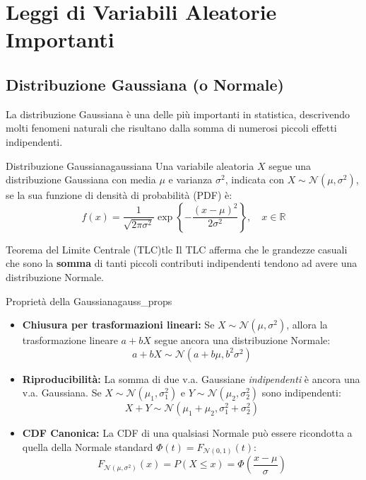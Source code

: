 \section{Leggi di Variabili Aleatorie Importanti}\label{sec:leggi_va}

\subsection{Distribuzione Gaussiana (o Normale)}
La distribuzione Gaussiana è una delle più importanti in statistica, descrivendo molti fenomeni naturali che risultano dalla somma di numerosi piccoli effetti indipendenti.

\begin{definizione}{Distribuzione Gaussiana}{gaussiana}
Una variabile aleatoria \(X\) segue una distribuzione Gaussiana con media \(\mu\) e varianza \(\sigma^2\), indicata con \(X \sim \mathcal{N}(\mu, \sigma^2)\), se la sua funzione di densità di probabilità (PDF) è:
\[
f(x) = \frac{1}{\sqrt{2\pi\sigma^2}} \exp\left\{ -\frac{(x-\mu)^2}{2\sigma^2} \right\}, \quad x \in \mathbb{R}
\]
\end{definizione}

\begin{nota}{Teorema del Limite Centrale (TLC)}{tlc}
Il TLC afferma che le grandezze casuali che sono la \textbf{somma} di tanti piccoli contributi indipendenti tendono ad avere una distribuzione Normale.
\end{nota}

\begin{proposizione}{Proprietà della Gaussiana}{gauss_props}
\begin{itemize}
    \item \textbf{Chiusura per trasformazioni lineari:} Se \(X \sim \mathcal{N}(\mu, \sigma^2)\), allora la trasformazione lineare \(a + bX\) segue ancora una distribuzione Normale:
    \[ a+bX \sim \mathcal{N}(a+b\mu, b^2\sigma^2) \]
    \item \textbf{Riproducibilità:} La somma di due v.a. Gaussiane \emph{indipendenti} è ancora una v.a. Gaussiana. Se \(X \sim \mathcal{N}(\mu_1, \sigma_1^2)\) e \(Y \sim \mathcal{N}(\mu_2, \sigma_2^2)\) sono indipendenti:
    \[ X+Y \sim \mathcal{N}(\mu_1+\mu_2, \sigma_1^2+\sigma_2^2) \]
    \item \textbf{CDF Canonica:} La CDF di una qualsiasi Normale può essere ricondotta a quella della Normale standard \( \Phi(t) = F_{\mathcal{N}(0,1)}(t) \):
    \[ F_{\mathcal{N}(\mu,\sigma^2)}(x) = P(X \le x) = \Phi\left(\frac{x-\mu}{\sigma}\right) \]
\end{itemize}
\end{proposizione}

